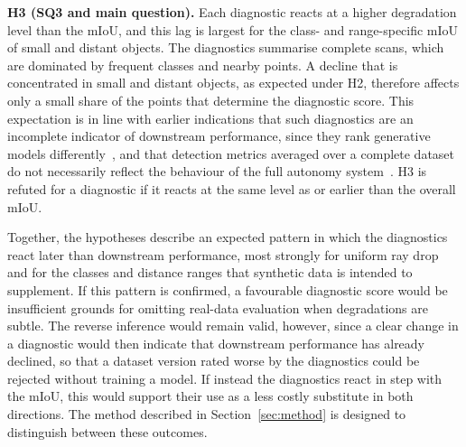 \textbf{H3 (SQ3 and main question).} Each diagnostic reacts at a higher degradation level than the mIoU, and this lag is largest for the class- and range-specific mIoU of small and distant objects. The diagnostics summarise complete scans, which are dominated by frequent classes and nearby points. A decline that is concentrated in small and distant objects, as expected under H2, therefore affects only a small share of the points that determine the diagnostic score. This expectation is in line with earlier indications that such diagnostics are an incomplete indicator of downstream performance, since they rank generative models differently~\cite{zyrianovLearningGenerateRealistic2022}, and that detection metrics averaged over a complete dataset do not necessarily reflect the behaviour of the full autonomy system~\cite{manivasagamZeroDomainGap2023}. H3 is refuted for a diagnostic if it reacts at the same level as or earlier than the overall mIoU.

Together, the hypotheses describe an expected pattern in which the diagnostics react later than downstream performance, most strongly for uniform ray drop and for the classes and distance ranges that synthetic data is intended to supplement. If this pattern is confirmed, a favourable diagnostic score would be insufficient grounds for omitting real-data evaluation when degradations are subtle. The reverse inference would remain valid, however, since a clear change in a diagnostic would then indicate that downstream performance has already declined, so that a dataset version rated worse by the diagnostics could be rejected without training a model. If instead the diagnostics react in step with the mIoU, this would support their use as a less costly substitute in both directions. The method described in Section~\ref{sec:method} is designed to distinguish between these outcomes.